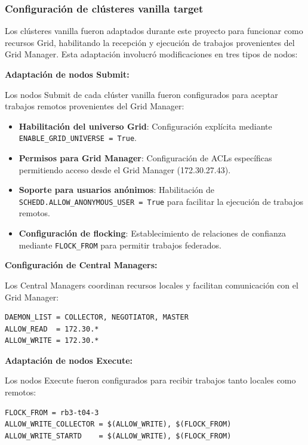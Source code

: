 \subsubsection{Configuración de clústeres vanilla target}
\noindent

Los clústeres vanilla fueron adaptados durante este proyecto para funcionar como recursos Grid, habilitando la recepción y ejecución de trabajos provenientes del Grid Manager. Esta adaptación involucró modificaciones en tres tipos de nodos:

\textbf{Adaptación de nodos Submit:}

Los nodos Submit de cada clúster vanilla fueron configurados para aceptar trabajos remotos provenientes del Grid Manager:

\begin{itemize}
	\item \textbf{Habilitación del universo Grid}: Configuración explícita mediante \texttt{ENABLE\_GRID\_UNIVERSE = True}.
	
	\item \textbf{Permisos para Grid Manager}: Configuración de ACLs específicas permitiendo acceso desde el Grid Manager (172.30.27.43).
	
	\item \textbf{Soporte para usuarios anónimos}: Habilitación de \texttt{SCHEDD.ALLOW\_ANONYMOUS\_USER = True} para facilitar la ejecución de trabajos remotos.
	
	\item \textbf{Configuración de flocking}: Establecimiento de relaciones de confianza mediante \texttt{FLOCK\_FROM} para permitir trabajos federados.
\end{itemize}

\textbf{Configuración de Central Managers:}

Los Central Managers coordinan recursos locales y facilitan comunicación con el Grid Manager:

\begin{verbatim}
DAEMON_LIST = COLLECTOR, NEGOTIATOR, MASTER
ALLOW_READ  = 172.30.*
ALLOW_WRITE = 172.30.*
\end{verbatim}

\textbf{Adaptación de nodos Execute:}

Los nodos Execute fueron configurados para recibir trabajos tanto locales como remotos:

\begin{verbatim}
FLOCK_FROM = rb3-t04-3
ALLOW_WRITE_COLLECTOR = $(ALLOW_WRITE), $(FLOCK_FROM)
ALLOW_WRITE_STARTD    = $(ALLOW_WRITE), $(FLOCK_FROM)
\end{verbatim}

